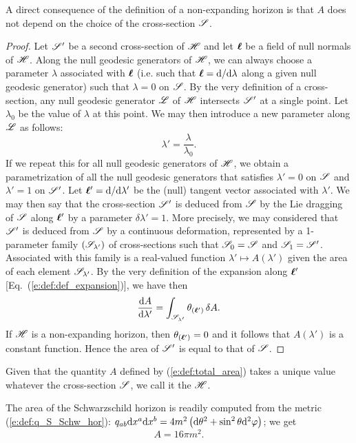 {{A direct consequence of the definition of a non-expanding horizon is that
$A$ does not depend on the choice of the cross-section $\mathscr{S}$.
\begin{proof}
Let $\mathscr{S}'$ be a second cross-section of $\mathscr{H}$ and let $\bm{\ell}$ be a field of null normals
of $\mathscr{H}$. Along the null geodesic generators of $\mathscr{H}$, we can always choose a parameter $\lambda$ associated with $\bm{\ell}$ (i.e. such that $\bm{\ell} = \mathrm{d}/\mathrm{d}\lambda$ along a given null geodesic generator)
such that $\lambda=0$ on $\mathscr{S}$. By the very definition of a cross-section,
any null geodesic generator $\mathscr{L}$ of $\mathscr{H}$ intersects $\mathscr{S}'$ at a single point. Let
$\lambda_0$ be the value of $\lambda$ at this point. We may then introduce
a new parameter along $\mathscr{L}$ as follows:
\[
      \lambda' = \frac{\lambda}{\lambda_0} .
\]
If we repeat this for all null geodesic generators of $\mathscr{H}$, we obtain a parametrization
of all the null geodesic generators that satisfies $\lambda'=0$ on $\mathscr{S}$ and $\lambda'=1$
on $\mathscr{S}'$. Let $\bm{\ell}'=\mathrm{d}/\mathrm{d}\lambda'$ be the (null) tangent vector associated
with $\lambda'$. We may then say that the cross-section $\mathscr{S}'$ is deduced
from $\mathscr{S}$ by the Lie dragging of $\mathscr{S}$ along $\bm{\ell}'$ by a parameter $\delta\lambda'=1$.
More precisely, we may considered that $\mathscr{S}'$ is deduced from $\mathscr{S}$ by a
continuous deformation, represented by a 1-parameter family $(\mathscr{S}_{\lambda'})$
of cross-sections such that $\mathscr{S}_0 = \mathscr{S}$ and $\mathscr{S}_1 = \mathscr{S}'$. Associated
with this family is a real-valued function $\lambda' \mapsto A(\lambda')$
given the area of each element $\mathscr{S}_{\lambda'}$. By the very definition
of the expansion along $\bm{\ell}'$ [Eq.~(\ref{e:def:def_expansion})], we have then
\[
    \frac{\mathrm{d} A}{\mathrm{d}\lambda'} = \int_{\mathscr{S}_{\lambda'}} \theta_{(\bm{\ell}')} \, \delta A .
\]
If $\mathscr{H}$ is a non-expanding horizon, then $\theta_{(\bm{\ell}')}=0$ and it follows
that $A(\lambda')$ is a constant function. Hence the area of $\mathscr{S}'$ is equal
to that of $\mathscr{S}$.
\end{proof}
Given that the quantity $A$ defined by (\ref{e:def:total_area})
takes a unique value whatever the cross-section $\mathscr{S}$,
we call it the 
$\mathscr{H}$.

\begin{example}
The area of the Schwarzschild horizon is readily computed from
the metric (\ref{e:def:q_S_Schw_hor}):
$q_{ab} \mathrm{d} x^a \mathrm{d} x^b = 4m^2 \left( \mathrm{d}\theta^2 + \sin^2\theta \mathrm{d}^2\varphi \right)$;
we get
\[
     A = 16\pi m^2 .
\]
\end{example}

}}
